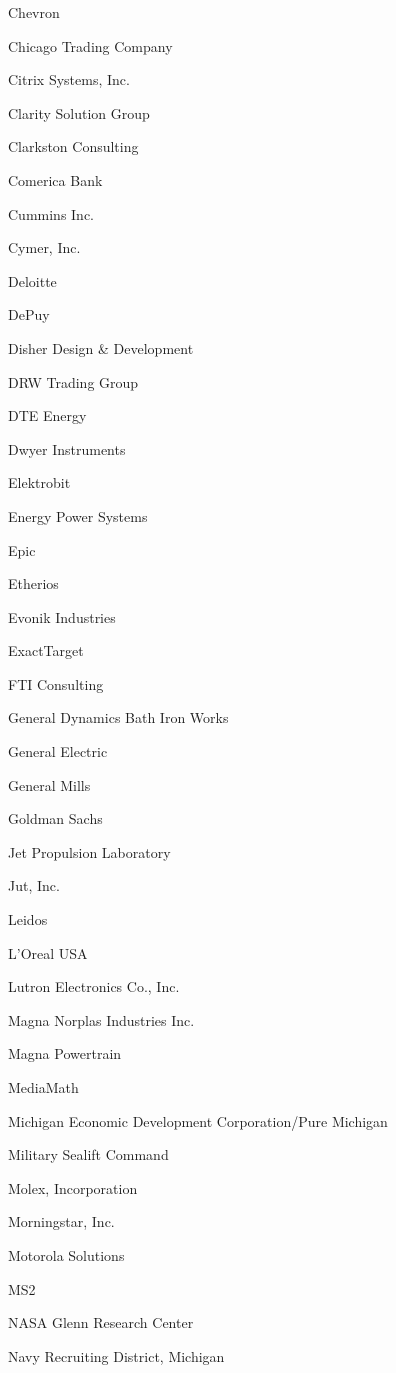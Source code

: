 \documentclass[twoside]{article}
\begin{document}
\begin{center}
\begin{multicols}{5}
\begin{FlushLeft}
\begin{compactitem}
\item Chevron
\item Chicago Trading Company
\item Citrix Systems, Inc.
\item Clarity Solution Group
\item Clarkston Consulting
\item Comerica Bank
\item Cummins Inc.
\item Cymer, Inc.
\item Deloitte
\item DePuy
\item Disher Design \& Development
\item DRW Trading Group
\item DTE Energy
\item Dwyer Instruments
\item Elektrobit
\item Energy Power Systems
\item Epic
\item Etherios
\item Evonik Industries
\item ExactTarget
\item FTI Consulting
\item General Dynamics Bath Iron Works
\item General Electric
\item General Mills
\item Goldman Sachs
\item Jet Propulsion Laboratory
\item Jut, Inc.
\item Leidos
\item L'Oreal USA
\item Lutron Electronics Co., Inc.
\item Magna Norplas Industries Inc.
\item Magna Powertrain
\item MediaMath
\item Michigan Economic Development Corporation/Pure Michigan
\item Military Sealift Command
\item Molex, Incorporation
\item Morningstar, Inc.
\item Motorola Solutions
\item MS2
\item NASA Glenn Research Center
\item Navy Recruiting District, Michigan

\end{compactitem}
\end{FlushLeft}
\end{multicols}
\end{center}
\end{document}
